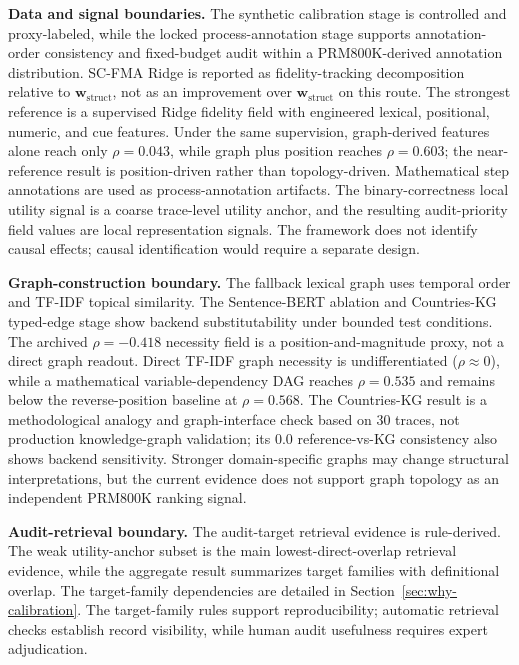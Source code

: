 \documentclass[pdflatex,sn-mathphys-num,iicol]{sn-jnl}
\newcommand{\wstruct}{\ensuremath{\mathbf{w}_{\mathrm{struct}}}}
\begin{document}
\medskip
\noindent\textbf{Data and signal boundaries.} The synthetic calibration stage is controlled and proxy-labeled, while the locked process-annotation stage supports annotation-order consistency and fixed-budget audit within a PRM800K-derived annotation distribution. SC-FMA Ridge is reported as fidelity-tracking decomposition relative to \wstruct{}, not as an improvement over \wstruct{} on this route. The strongest reference is a supervised Ridge fidelity field with engineered lexical, positional, numeric, and cue features. Under the same supervision, graph-derived features alone reach only $\rho=0.043$, while graph plus position reaches $\rho=0.603$; the near-reference result is position-driven rather than topology-driven. Mathematical step annotations are used as process-annotation artifacts. The binary-correctness local utility signal is a coarse trace-level utility anchor, and the resulting audit-priority field values are local representation signals. The framework does not identify causal effects; causal identification would require a separate design.

\textbf{Graph-construction boundary.} The fallback lexical graph uses temporal order and TF-IDF topical similarity. The Sentence-BERT ablation and Countries-KG typed-edge stage show backend substitutability under bounded test conditions. The archived $\rho=-0.418$ necessity field is a position-and-magnitude proxy, not a direct graph readout. Direct TF-IDF graph necessity is undifferentiated ($\rho\approx0$), while a mathematical variable-dependency DAG reaches $\rho=0.535$ and remains below the reverse-position baseline at $\rho=0.568$. The Countries-KG result is a methodological analogy and graph-interface check based on 30 traces, not production knowledge-graph validation; its 0.0 reference-vs-KG consistency also shows backend sensitivity. Stronger domain-specific graphs may change structural interpretations, but the current evidence does not support graph topology as an independent PRM800K ranking signal.

\textbf{Audit-retrieval boundary.} The audit-target retrieval evidence is rule-derived. The weak utility-anchor subset is the main lowest-direct-overlap retrieval evidence, while the aggregate result summarizes target families with definitional overlap. The target-family dependencies are detailed in Section~\ref{sec:why-calibration}. The target-family rules support reproducibility; automatic retrieval checks establish record visibility, while human audit usefulness requires expert adjudication.
\end{document}
